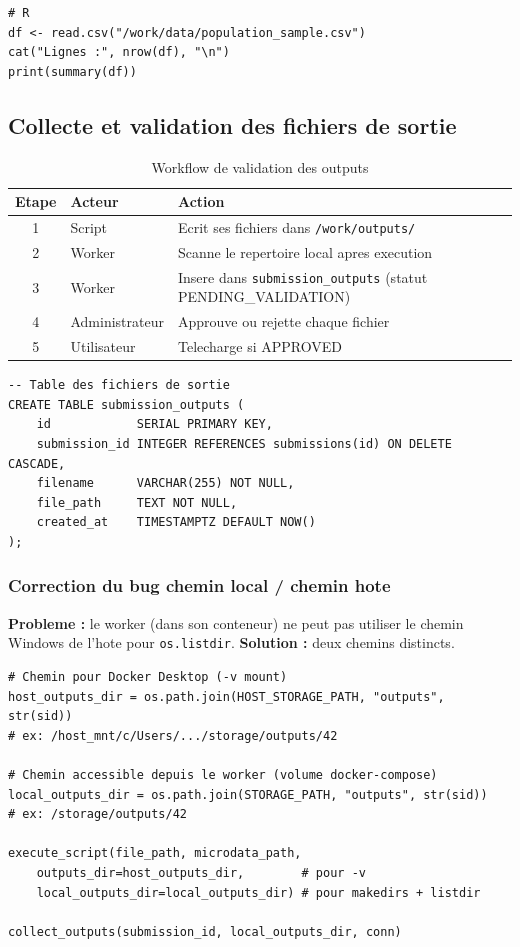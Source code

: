 \documentclass[12pt,a4paper]{article}
\begin{document}
\begin{lstlisting}
# R
df <- read.csv("/work/data/population_sample.csv")
cat("Lignes :", nrow(df), "\n")
print(summary(df))
\end{lstlisting}

\subsection{Collecte et validation des fichiers de sortie}

\begin{table}[H]
\centering
\caption{Workflow de validation des outputs}
\begin{tabularx}{\textwidth}{@{}clX@{}}
\toprule
Etape & Acteur & Action \\
\midrule
1 & Script         & Ecrit ses fichiers dans \texttt{/work/outputs/} \\
2 & Worker         & Scanne le repertoire local apres execution \\
3 & Worker         & Insere dans \texttt{submission\_outputs} (statut PENDING\_VALIDATION) \\
4 & Administrateur & Approuve ou rejette chaque fichier \\
5 & Utilisateur    & Telecharge si APPROVED \\
\bottomrule
\end{tabularx}
\end{table}

\begin{lstlisting}
-- Table des fichiers de sortie
CREATE TABLE submission_outputs (
    id            SERIAL PRIMARY KEY,
    submission_id INTEGER REFERENCES submissions(id) ON DELETE CASCADE,
    filename      VARCHAR(255) NOT NULL,
    file_path     TEXT NOT NULL,
    created_at    TIMESTAMPTZ DEFAULT NOW()
);
\end{lstlisting}

\subsubsection*{Correction du bug chemin local / chemin hote}

\textbf{Probleme :} le worker (dans son conteneur) ne peut pas utiliser le chemin
Windows de l'hote pour \texttt{os.listdir}. \textbf{Solution :} deux chemins distincts.

\begin{lstlisting}
# Chemin pour Docker Desktop (-v mount)
host_outputs_dir = os.path.join(HOST_STORAGE_PATH, "outputs", str(sid))
# ex: /host_mnt/c/Users/.../storage/outputs/42

# Chemin accessible depuis le worker (volume docker-compose)
local_outputs_dir = os.path.join(STORAGE_PATH, "outputs", str(sid))
# ex: /storage/outputs/42

execute_script(file_path, microdata_path,
    outputs_dir=host_outputs_dir,        # pour -v
    local_outputs_dir=local_outputs_dir) # pour makedirs + listdir

collect_outputs(submission_id, local_outputs_dir, conn)
\end{lstlisting}
\end{document}
